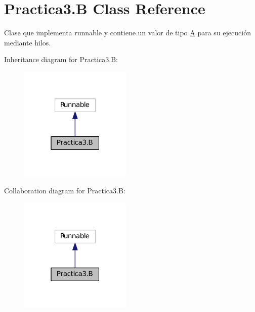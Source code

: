 \hypertarget{class_practica3_1_1_b}{}\section{Practica3.\+B Class Reference}
\label{class_practica3_1_1_b}


Clase que implementa runnable y contiene un valor de tipo \hyperlink{class_practica3_1_1_a}{A} para su ejecución mediante hilos.  




Inheritance diagram for Practica3.\+B\+:
\nopagebreak
\begin{figure}[H]
\begin{center}
\leavevmode
\includegraphics[width=151pt]{class_practica3_1_1_b__inherit__graph}
\end{center}
\end{figure}


Collaboration diagram for Practica3.\+B\+:
\nopagebreak
\begin{figure}[H]
\begin{center}
\leavevmode
\includegraphics[width=151pt]{class_practica3_1_1_b__coll__graph}
\end{center}
\end{figure}
